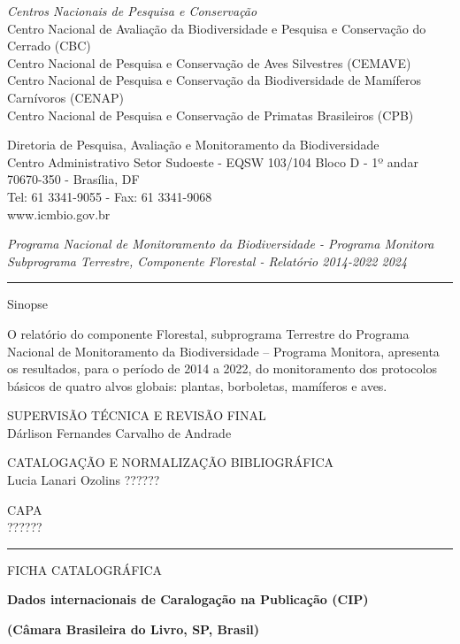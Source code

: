 \documentclass[
  letterpaper,
]{scrbook}
\begin{document}
\emph{Centros Nacionais de Pesquisa e Conservação}\\
Centro Nacional de Avaliação da Biodiversidade e Pesquisa e Conservação
do Cerrado (CBC)\\
Centro Nacional de Pesquisa e Conservação de Aves Silvestres (CEMAVE)\\
Centro Nacional de Pesquisa e Conservação da Biodiversidade de Mamíferos
Carnívoros (CENAP)\\
Centro Nacional de Pesquisa e Conservação de Primatas Brasileiros (CPB)

Diretoria de Pesquisa, Avaliação e Monitoramento da Biodiversidade\\
Centro Administrativo Setor Sudoeste - EQSW 103/104 Bloco D - 1º andar\\
70670-350 - Brasília, DF\\
Tel: 61 3341-9055 - Fax: 61 3341-9068\\
www.icmbio.gov.br

\emph{Programa Nacional de Monitoramento da Biodiversidade - Programa
Monitora} \emph{Subprograma Terrestre, Componente Florestal - Relatório
2014-2022 \textbar{} 2024}

\begin{center}\rule{0.5\linewidth}{0.5pt}\end{center}

Sinopse

O relatório do componente Florestal, subprograma Terrestre do Programa
Nacional de Monitoramento da Biodiversidade -- Programa Monitora,
apresenta os resultados, para o período de 2014 a 2022, do monitoramento
dos protocolos básicos de quatro alvos globais: plantas, borboletas,
mamíferos e aves.

SUPERVISÃO TÉCNICA E REVISÃO FINAL\\
Dárlison Fernandes Carvalho de Andrade

CATALOGAÇÃO E NORMALIZAÇÃO BIBLIOGRÁFICA\\
Lucia Lanari Ozolins ??????

CAPA\\
??????

\begin{center}\rule{0.5\linewidth}{0.5pt}\end{center}

FICHA CATALOGRÁFICA

\textbf{Dados internacionais de Caralogação na Publicação (CIP)}

\textbf{(Câmara Brasileira do Livro, SP, Brasil)}
\end{document}
